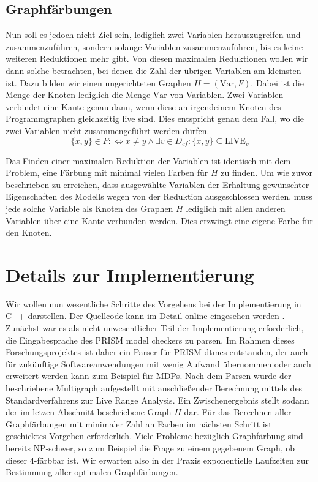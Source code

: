\documentclass[a4paper]{article}
\theoremstyle{nonumberplain}
\begin{document}
\subsection{Graphfärbungen}

Nun soll es jedoch nicht Ziel sein, lediglich zwei Variablen herauszugreifen und zusammenzuführen, sondern solange Variablen zusammenzuführen, bis es keine weiteren Reduktionen mehr gibt.
Von diesen maximalen Reduktionen wollen wir dann solche betrachten, bei denen die Zahl der übrigen Variablen am kleinsten ist.
Dazu bilden wir einen ungerichteten Graphen $H=(\mathrm{Var}, F)$. Dabei ist die Menge der Knoten lediglich die Menge $\mathrm{Var}$ von Variablen.
Zwei Variablen verbindet eine Kante genau dann, wenn diese an irgendeinem Knoten des Programmgraphen gleichzeitig live sind. Dies entspricht genau dem Fall, wo die zwei Variablen nicht zusammengeführt werden dürfen.
\[
\{x,y\} \in F :\Leftrightarrow x \neq y \land \exists v \in D_{cf} : \{x, y\} \subseteq \textrm{LIVE}_v 
\]

Das Finden einer maximalen Reduktion der Variablen ist identisch mit dem Problem, eine Färbung mit minimal vielen Farben für $H$ zu finden.
Um wie zuvor beschrieben zu erreichen, dass ausgewählte Variablen der Erhaltung gewünschter Eigenschaften des Modells wegen von der Reduktion ausgeschlossen werden, muss jede solche Variable als Knoten des Graphen $H$ lediglich mit allen anderen Variablen über eine Kante verbunden werden. Dies erzwingt eine eigene Farbe für den Knoten.

\section{Details zur Implementierung}

Wir wollen nun wesentliche Schritte des Vorgehens bei der Implementierung in C++ darstellen.
Der Quellcode kann im Detail online eingesehen werden \cite{PSR}.
Zunächst war es als nicht unwesentlicher Teil der Implementierung erforderlich, die Eingabesprache des PRISM model checkers zu parsen.
Im Rahmen dieses Forschungsprojektes ist daher ein Parser für PRISM dtmcs entstanden, der auch für zukünftige Softwareanwendungen mit wenig Aufwand übernommen oder auch erweitert werden kann zum Beispiel für MDPs.
Nach dem Parsen wurde der beschriebene Multigraph aufgestellt mit anschließender Berechnung mittels des Standardverfahrens zur Live Range Analysis. Ein Zwischenergebnis stellt sodann der im letzen Abschnitt beschriebene Graph $H$ dar.
Für das Berechnen aller Graphfärbungen mit minimaler Zahl an Farben im nächsten Schritt ist geschicktes Vorgehen erforderlich.
Viele Probleme bezüglich Graphfärbung sind bereits NP-schwer, so zum Beispiel die Frage zu einem gegebenem Graph, ob dieser 4-färbbar ist.
Wir erwarten also in der Praxis exponentielle Laufzeiten zur Bestimmung aller optimalen Graphfärbungen.
\end{document}
